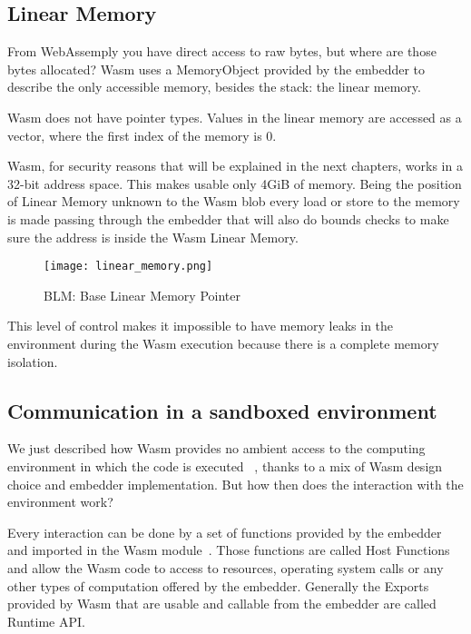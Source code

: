 \subsection{Linear Memory}

From WebAssemply you have direct access to raw bytes, but where are  those bytes allocated? Wasm uses a MemoryObject provided by the embedder to describe the only accessible memory, besides the stack: the linear memory.~\cite{linear-memory}

Wasm does not have pointer types. Values in the linear memory are accessed as a vector, where the first index of the memory is 0.

Wasm, for security reasons that will be explained in the next chapters, works in a 32-bit address space. This makes usable only 4GiB of memory. Being the position of Linear Memory unknown to the Wasm blob every load or store to the memory is made passing through the embedder that will also do bounds checks to make sure the address is inside the Wasm Linear Memory.

\begin{figure}[h]
  \centering
  \texttt{[image: linear\_memory.png]}
  \caption{BLM: Base Linear Memory Pointer}
  \label{fig:linear_memory}
\end{figure}

This level of control makes it impossible to have memory leaks in the environment during the Wasm execution because there is a complete memory isolation. ~\cite{linear-memory}

\subsection{Communication in a sandboxed environment}

We just described how Wasm provides no ambient access to the computing environment in which the code is executed ~\cite{wasm-core-spec}, thanks to a mix of Wasm design choice and embedder implementation. But how  then does the interaction with the environment work?

Every interaction can be done by a set of functions provided by the embedder and imported in the Wasm module~\cite{wasm-core-spec}. Those functions are called Host Functions and allow the Wasm code to access to resources, operating system calls or any other types of computation offered by the embedder. Generally the Exports provided by Wasm that are usable and callable from the embedder are called Runtime API.

